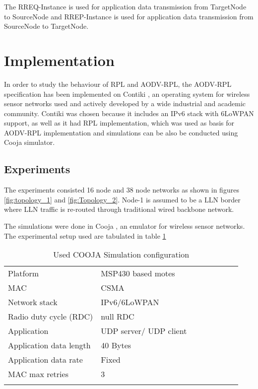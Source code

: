 \documentclass[conference, letterpaper]{IEEEtran}
\begin{document}
The RREQ-Instance is used for application data transmission from TargetNode to
SourceNode and RREP-Instance is used for application data transmission from
SourceNode to TargetNode.

\section{Implementation}\label{Section.IV}
In order to study the behaviour of RPL and AODV-RPL, the AODV-RPL specification
has been implemented on Contiki \cite{contiki}, an operating system for
wireless sensor networks used and actively developed by a wide industrial and
academic community. Contiki was chosen because it includes an IPv6 stack with
6LoWPAN support, as well as it had RPL implementation, which was used as
basis for  AODV-RPL implementation and simulations can be also be conducted
using Cooja simulator.

\subsection{Experiments}
The experiments consisted 16 node and 38 node networks as shown in figures
\ref{fig:topology_1} and \ref{fig:Topology_2}. Node-1 is assumed to be a LLN
border where LLN traffic is re-routed through traditional wired backbone
network.

The simulations were done in Cooja \cite{contiki}, an emulator for
wireless sensor networks. The experimental setup used are
tabulated in table \ref{tab1:simsetup}
\begin{table}[h!]
\centering
\begin{tabular}{llllllll}
\toprule
\midrule Platform & MSP430 based motes \\ MAC & CSMA  \\ Network stack
& IPv6/6LoWPAN \\ Radio duty cycle (RDC) & null RDC \\  Application & UDP
server/ UDP client\\  Application data length & 40 Bytes \\ Application data
rate & Fixed \\  MAC max retries & 3\\ \bottomrule \\ \end{tabular}
\caption{Used COOJA Simulation configuration } \label{tab1:simsetup}
\end{table}
\end{document}
